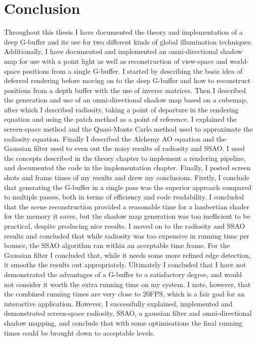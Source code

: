 \chapter{Conclusion}
Throughout this thesis I have documented the theory and implementation of a deep G-buffer and its use for two different kinds of global illumination techniques. Additionally, I have documented and implemented an omni-directional shadow map for use with a point light as well as reconstruction of view-space and world-space positions from a single G-buffer. I started by describing the basic idea of deferred rendering before moving on to the deep G-buffer and how to reconstruct positions from a depth buffer with the use of inverse matrices. Then I described the generation and use of an omni-directional shadow map based on a cubemap, after which I described radiosity, taking a point of departure in the rendering equation and using the patch method as a point of reference. I explained the screen-space method and the Quasi-Monte Carlo method used to approximate the radiosity equation. Finally I described the Alchemy AO equation and the Gaussian filter used to even out the noisy results of radiosity and SSAO. I used the concepts described in the theory chapter to implement a rendering pipeline, and documented the code in the implementation chapter. Finally, I posted screen shots and frame times of my results and drew my conclusions. Firstly, I conclude that generating the G-buffer in a single pass was the superior approach compared to multiple passes, both in terms of efficiency and code readability. I concluded that the scene reconstruction provided a reasonable time for a lambertian shader for the memory it saves, but the shadow map generation was too inefficient to be practical, despite producing nice results. I moved on to the radiosity and SSAO results and concluded that while radiosity was too expensive in running time per bounce, the SSAO algorithm ran within an acceptable time frame. For the Gaussian filter I concluded that, while it needs some more refined edge detection, it smooths the results out appropriately. Ultimately I concluded that I have not demonstrated the advantages of a G-buffer to a satisfactory degree, and would not consider it worth the extra running time on my system. I note, however, that the combined running times are very close to 20FPS, which is a fair goal for an interactive application. However, I successfully explained, implemented and demonstrated screen-space radiosity, SSAO, a gaussian filter and omni-directional shadow mapping, and conclude that with some optimisations the final running times could be brought down to acceptable levels.